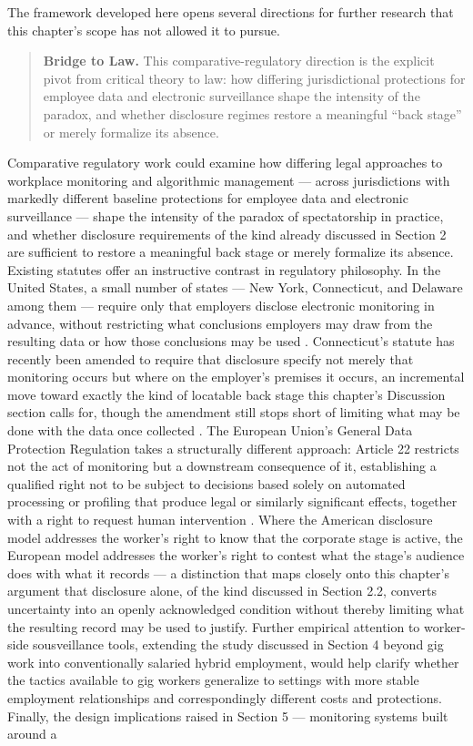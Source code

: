 \documentclass[12pt, a4paper]{article}
\begin{document}
The framework developed here opens several directions for further research that this chapter's scope has not allowed it to pursue.

\begin{quote}
\textbf{Bridge to Law.} This comparative-regulatory direction is the explicit pivot from critical theory to law: how differing jurisdictional protections for employee data and electronic surveillance shape the intensity of the paradox, and whether disclosure regimes restore a meaningful ``back stage'' or merely formalize its absence.
\end{quote}

Comparative regulatory work could examine how differing legal approaches to workplace monitoring and algorithmic management --- across jurisdictions with markedly different baseline protections for employee data and electronic surveillance --- shape the intensity of the paradox of spectatorship in practice, and whether disclosure requirements of the kind already discussed in Section 2 are sufficient to restore a meaningful back stage or merely formalize its absence. Existing statutes offer an instructive contrast in regulatory philosophy. In the United States, a small number of states --- New York, Connecticut, and Delaware among them --- require only that employers disclose electronic monitoring in advance, without restricting what conclusions employers may draw from the resulting data or how those conclusions may be used \parencite{nycivilrights52c,ctgenstat31-48d}. Connecticut's statute has recently been amended to require that disclosure specify not merely that monitoring occurs but where on the employer's premises it occurs, an incremental move toward exactly the kind of locatable back stage this chapter's Discussion section calls for, though the amendment still stops short of limiting what may be done with the data once collected \parencite{ctgenstat31-48d}. The European Union's General Data Protection Regulation takes a structurally different approach: Article 22 restricts not the act of monitoring but a downstream consequence of it, establishing a qualified right not to be subject to decisions based solely on automated processing or profiling that produce legal or similarly significant effects, together with a right to request human intervention \parencite{gdprart22}. Where the American disclosure model addresses the worker's right to know that the corporate stage is active, the European model addresses the worker's right to contest what the stage's audience does with what it records --- a distinction that maps closely onto this chapter's argument that disclosure alone, of the kind discussed in Section 2.2, converts uncertainty into an openly acknowledged condition without thereby limiting what the resulting record may be used to justify. Further empirical attention to worker-side sousveillance tools, extending the study discussed in Section 4 beyond gig work into conventionally salaried hybrid employment, would help clarify whether the tactics available to gig workers generalize to settings with more stable employment relationships and correspondingly different costs and protections. Finally, the design implications raised in Section 5 --- monitoring systems built around a 
\end{document}
